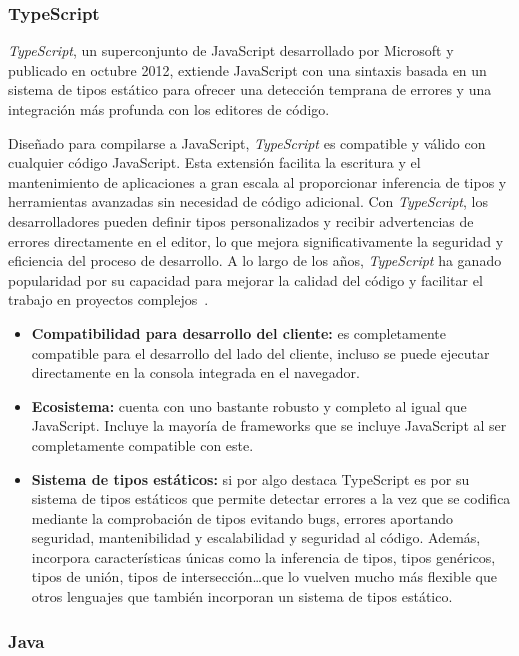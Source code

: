 \subsubsection{TypeScript}

\textit{TypeScript}, un superconjunto de JavaScript desarrollado por Microsoft y publicado en octubre 2012, extiende JavaScript con una sintaxis basada en un sistema de tipos estático para ofrecer una detección temprana de errores y una integración más profunda con los editores de código.

Diseñado para compilarse a JavaScript, \textit{TypeScript} es compatible y válido con cualquier código JavaScript. Esta extensión facilita la escritura y el mantenimiento de aplicaciones a gran escala al proporcionar inferencia de tipos y herramientas avanzadas sin necesidad de código adicional. Con \textit{TypeScript}, los desarrolladores pueden definir tipos personalizados y recibir advertencias de errores directamente en el editor, lo que mejora significativamente la seguridad y eficiencia del proceso de desarrollo. A lo largo de los años, \textit{TypeScript} ha ganado popularidad por su capacidad para mejorar la calidad del código y facilitar el trabajo en proyectos complejos~\cite{typescript-wiki}.

\begin{itemize}
    \item[\esp] \textbf{Compatibilidad para desarrollo del cliente:} es completamente compatible para el desarrollo del lado del cliente, incluso se puede ejecutar directamente en la consola integrada en el navegador.
    \item[\esp] \textbf{Ecosistema:} cuenta con uno bastante robusto y completo al igual que JavaScript. Incluye la mayoría de frameworks que se incluye JavaScript al ser completamente compatible con este.
    \item[\esp] \textbf{Sistema de tipos estáticos:} si por algo destaca TypeScript es por su sistema de tipos estáticos que permite detectar errores a la vez que se codifica mediante la comprobación de tipos evitando bugs, errores aportando seguridad, mantenibilidad y escalabilidad y seguridad al código. Además, incorpora características únicas como la inferencia de tipos, tipos genéricos, tipos de unión, tipos de intersección\ldots que lo vuelven mucho más flexible que otros lenguajes que también incorporan un sistema de tipos estático.
\end{itemize}

\subsubsection{Java}

